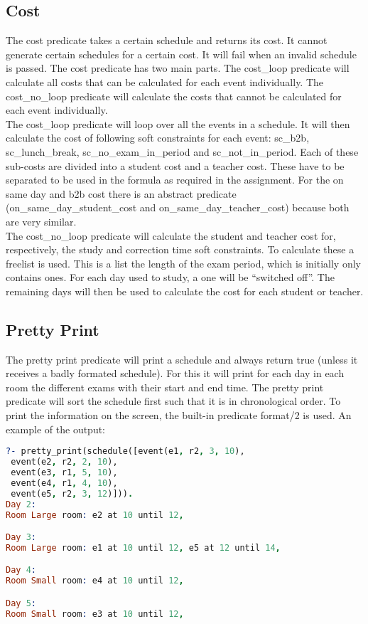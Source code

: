 \documentclass[11pt]{article}
\begin{document}
\subsection{Cost}
The cost predicate takes a certain schedule and returns its cost. It cannot generate certain schedules for a certain cost. It will fail when an invalid schedule is passed. The cost predicate has two main parts. The cost\_loop predicate will calculate all costs that can be calculated for each event individually. The cost\_no\_loop predicate will calculate the costs that cannot be calculated for each event individually. \\
The cost\_loop predicate will loop over all the events in a schedule. It will then calculate the cost of following soft constraints for each event: sc\_b2b, sc\_lunch\_break, sc\_no\_exam\_in\_period and sc\_not\_in\_period. Each of these sub-costs are divided into a student cost and a teacher cost. These have to be separated to be used in the formula as required in the assignment. For the on same day and b2b cost there is an abstract predicate (on\_same\_day\_student\_cost and on\_same\_day\_teacher\_cost) because both are very similar.\\
The cost\_no\_loop predicate will calculate the student and teacher cost for, respectively, the study and correction time soft constraints. To calculate these a freelist is used. This is a list the length of the exam period, which is initially only contains ones. For each day used to study, a one will be ``switched off''. The remaining days will then be used to calculate the cost for each student or teacher.

\subsection{Pretty Print}
The pretty print predicate will print a schedule and always return true (unless it receives a badly formated schedule). For this it will print for each day in each room the different exams with their start and end time. The pretty print predicate will sort the schedule first such that it is in chronological order. To print the information on the screen, the built-in predicate format/2 is used. An example of the output:
\begin{lstlisting}[basicstyle=\small,language=prolog]
?- pretty_print(schedule([event(e1, r2, 3, 10),
 event(e2, r2, 2, 10),
 event(e3, r1, 5, 10),
 event(e4, r1, 4, 10),
 event(e5, r2, 3, 12)])).
Day 2: 
Room Large room: e2 at 10 until 12, 

Day 3: 
Room Large room: e1 at 10 until 12, e5 at 12 until 14, 

Day 4: 
Room Small room: e4 at 10 until 12, 

Day 5: 
Room Small room: e3 at 10 until 12, 
\end{lstlisting}
\end{document}
